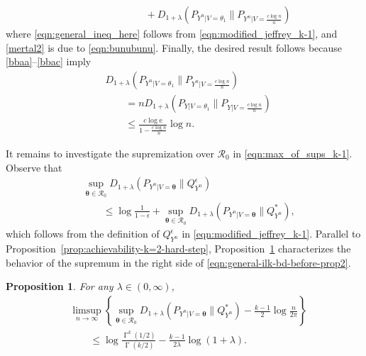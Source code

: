 \documentclass[journal, 10pt]{IEEEtran}
\newcommand{\rme}{\mathrm{e}}
\newcommand{\cR}{\mathcal{R}}
\theoremstyle{plain}
\theoremstyle{plain}
\theoremstyle{plain}
\newtheorem{prop}{Proposition}%
\theoremstyle{plain}
\newcommand{\boldtheta}{\mathbold{\theta}}
\newcommand{\opGamma}{\operatorname{\Gamma}}
\begin{document}
\begin{IEEEproof}
\begin{align}
&\qquad \qquad \qquad \nonumber + D_{1+\lambda}\left(P_{Y^n|V=\theta_1} \| P_{Y^n|V=\frac{c\log n}{n}}\right)  
\end{align}
where \eqref{eqn:general_ineq_here} follows from \eqref{eqn:modified_jeffrey_k-1}, and \eqref{mertal2} is due to \eqref{eqn:bunubunu}. Finally, the desired result follows because \eqref{bbaa}--\eqref{bbac} imply
\begin{align}
	& D_{1+\lambda}\left( P_{Y^n|V=\theta_1}  \| P_{Y^n|V=\frac{c\log n}{n}}\right)\nonumber \\ 
	&\qquad = n D_{1+\lambda}\left( P_{Y|V=\theta_1}  \| P_{Y|V=\frac{c\log n}{n}}\right)  \\
	&\qquad \le \frac{c\log \rme}{1-\frac{c\log n}{n}} \log n \text{.}
\end{align}
\end{IEEEproof} 
It remains to investigate the supremization over $\cR_0$ in \eqref{eqn:max_of_sups_k-1}. Observe that
\begin{align}
&\sup_{\boldtheta \in \cR_0} D_{1+\lambda}(P_{Y^n|V=\boldtheta} \| Q_{Y^n}^\epsilon) \nonumber \\  
&\qquad  \le \log \frac{1}{1-\epsilon}+ \sup_{\boldtheta \in \cR_0} D_{1+\lambda}(P_{Y^n|V=\boldtheta} \| Q_{Y^n}^\ast )\text{,} \label{eqn:general-ilk-bd-before-prop2}
\end{align}
which follows from the definition of $Q_{Y^n}^\epsilon$ in \eqref{eqn:modified_jeffrey_k-1}. Parallel to Proposition~\ref{prop:achievability-k=2-hard-step}, Proposition~\ref{prop:general-hard to prove} characterizes the behavior of the supremum in the right side of \eqref{eqn:general-ilk-bd-before-prop2}.
\begin{prop} \label{prop:general-hard to prove}
For any $\lambda \in (0, \infty)$, 
\begin{align}
&\limsup_{n\to \infty} \left\{  \sup_{\boldtheta \in \cR_0} D_{1+\lambda}(P_{Y^n|V=\boldtheta}\| Q^{\ast}_{Y^n})-\frac{k-1}{2}\log \frac{n}{2\pi} \right\} \nonumber \\
&\qquad \le \log \frac{\opGamma^k(1/2)}{\opGamma(k/2)}-\frac{k-1}{2\lambda}\log(1+\lambda) \text{.} \label{aqzz}
\end{align}
\end{prop}
\end{document}

